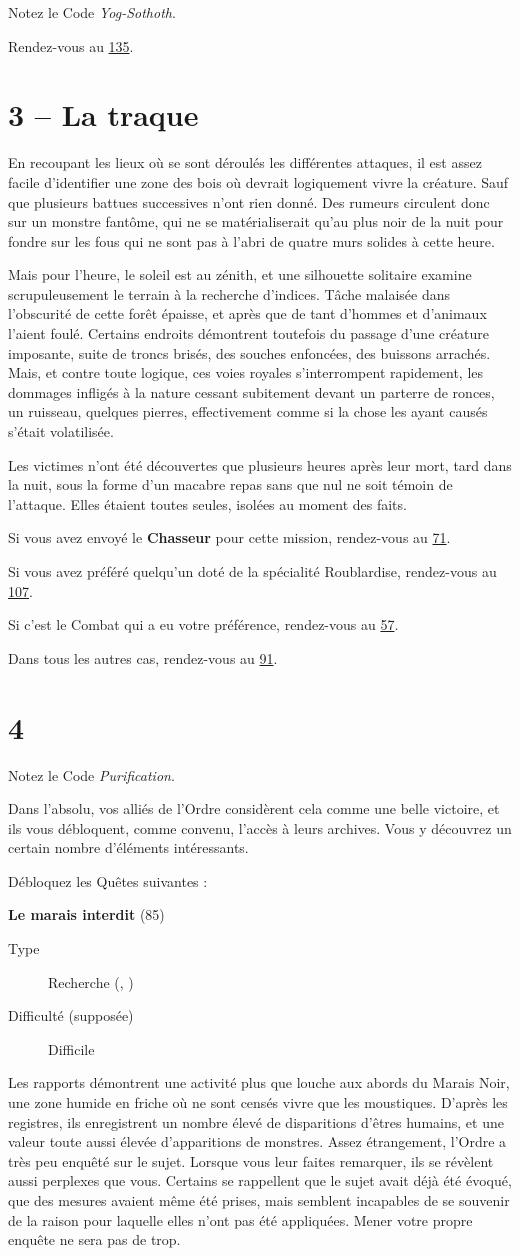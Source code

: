 \documentclass{report}
\newcommand{\gsection}[1]{
    \section{#1}
    \label{section-#1}
}
\newcommand{\glink}[1]{\hyperref[section-#1]{#1}}
\newcommand{\quest}[5]{
    \begin{mdframed}[innertopmargin=0.5cm,innerbottommargin=0.5cm,leftmargin=0.5cm,rightmargin=0.5cm]
        \begin{center}
            \textbf{#1} (#2)
        \end{center}
        \begin{description}
            \item[Type] #3
            \item[Difficulté (supposée)] #4
        \end{description}
        #5
    \end{mdframed}
}
\newcommand{\hero}[1]{\textbf{#1}}
\begin{document}
Notez le Code \emph{Yog-Sothoth}.

Rendez-vous au \glink{135}.

\gsection{3 – La traque}

En recoupant les lieux où se sont déroulés les différentes attaques, il est assez facile d'identifier une zone des bois où devrait logiquement vivre la créature. Sauf que plusieurs battues successives n'ont rien donné. Des rumeurs circulent donc sur un monstre fantôme, qui ne se matérialiserait qu'au plus noir de la nuit pour fondre sur les fous qui ne sont pas à l'abri de quatre murs solides à cette heure.

Mais pour l'heure, le soleil est au zénith, et une silhouette solitaire examine scrupuleusement le terrain à la recherche d'indices. Tâche malaisée dans l'obscurité de cette forêt épaisse, et après que de tant d'hommes et d'animaux l'aient foulé. Certains endroits démontrent toutefois du passage d'une créature imposante, suite de troncs brisés, des souches enfoncées, des buissons arrachés. Mais, et contre toute logique, ces voies royales s'interrompent rapidement, les dommages infligés à la nature cessant subitement devant un parterre de ronces, un ruisseau, quelques pierres, effectivement comme si la chose les ayant causés s'était volatilisée.

Les victimes n'ont été découvertes que plusieurs heures après leur mort, tard dans la nuit, sous la forme d'un macabre repas sans que nul ne soit témoin de l'attaque. Elles étaient toutes seules, isolées au moment des faits.

Si vous avez envoyé le \hero{Chasseur} pour cette mission, rendez-vous au \glink{71}.

Si vous avez préféré quelqu'un doté de la spécialité Roublardise, rendez-vous au \glink{107}.

Si c'est le Combat qui a eu votre préférence, rendez-vous au \glink{57}.

Dans tous les autres cas, rendez-vous au \glink{91}.

\gsection{4}

Notez le Code \emph{Purification}.

Dans l'absolu, vos alliés de l'Ordre considèrent cela comme une belle victoire, et ils vous débloquent, comme convenu, l'accès à leurs archives. Vous y découvrez un certain nombre d'éléments intéressants.

Débloquez les Quêtes suivantes :

\quest{Le marais interdit}{85}{Recherche (\ankh, \caduceus)}{Difficile}{
Les rapports démontrent une activité plus que louche aux abords du Marais Noir, une zone humide en friche où ne sont censés vivre que les moustiques. D'après les registres, ils enregistrent un nombre élevé de disparitions d'êtres humains, et une valeur toute aussi élevée d'apparitions de monstres. Assez étrangement, l'Ordre a très peu enquêté sur le sujet. Lorsque vous leur faites remarquer, ils se révèlent aussi perplexes que vous. Certains se rappellent que le sujet avait déjà été évoqué, que des mesures avaient même été prises, mais semblent incapables de se souvenir de la raison pour laquelle elles n'ont pas été appliquées. Mener votre propre enquête ne sera pas de trop.
}
\end{document}
